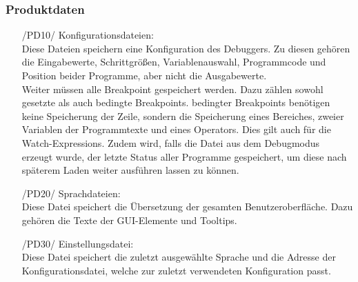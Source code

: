 \documentclass[parskip=full]{scrartcl}
\begin{document}
		\subsubsection{Produktdaten}
		\begin{itemize}
		
		
			\item[/PD10/] Konfigurationsdateien: \\
			Diese Dateien speichern eine Konfiguration des Debuggers. 
			Zu diesen gehören die Eingabewerte, Schrittgrößen, Variablenauswahl, Programmcode und Position beider Programme, aber nicht die Ausgabewerte. \\
			Weiter müssen alle \gls{Breakpoint} gespeichert werden. Dazu zählen sowohl gesetzte als auch bedingte Breakpoints. \Glspl{bedingter Breakpoint} benötigen keine Speicherung der Zeile, 			sondern die Speicherung eines Bereiches, zweier Variablen der Programmtexte und eines Operators. Dies gilt auch für die \glspl{Watch-Expression}.
			Zudem wird, falls die Datei aus dem \gls{Debugmodus} erzeugt wurde, der letzte Status aller Programme gespeichert, um diese nach späterem Laden weiter ausführen lassen zu können. 
			
			\item[/PD20/] Sprachdateien: \\
			Diese Datei speichert die Übersetzung der gesamten Benutzeroberfläche.
			Dazu gehören die Texte der GUI-Elemente und \glspl{Tooltip}.
			
			\item[/PD30/] Einstellungsdatei: \\
			Diese Datei speichert die zuletzt ausgewählte Sprache und die Adresse der \gls{Konfigurationsdatei}, welche zur zuletzt verwendeten Konfiguration passt.  
			\end{itemize}
			
			 
\end{document}
